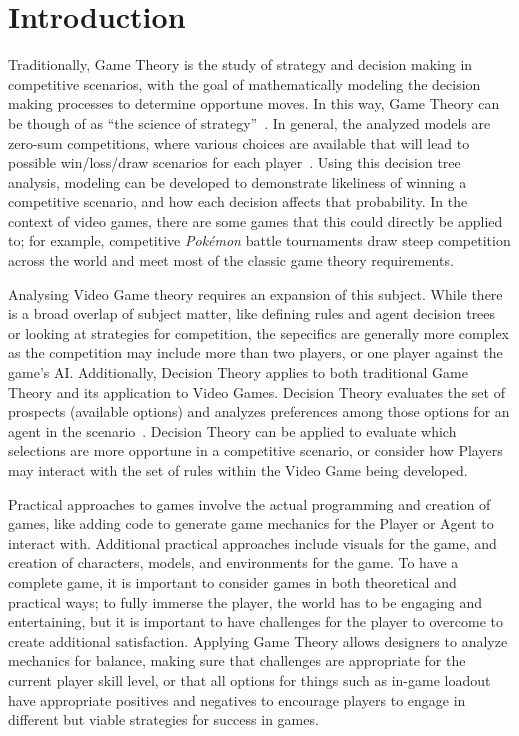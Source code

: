 
\section{Introduction}

Traditionally, Game Theory is the study of strategy and decision making in competitive scenarios, with the goal of mathematically modeling the decision making processes to determine opportune moves. In this way, Game Theory can be though of as ``the science of strategy''~\cite{b3}. In general, the analyzed models are zero-sum competitions, where various choices are available that will lead to possible win/loss/draw scenarios for each player~\cite{b1}. Using this decision tree analysis, modeling can be developed to demonstrate likeliness of winning a competitive scenario, and how each decision affects that probability. In the context of video games, there are some games that this could directly be applied to; for example, competitive \textit{Pok\'emon} battle tournaments draw steep competition across the world and meet most of the classic game theory requirements. 

Analysing Video Game theory requires an expansion of this subject. While there is a broad overlap of subject matter, like defining rules and agent decision trees or looking at strategies for competition, the sepecifics are generally more complex as the competition may include more than two players,  or one player against the game's \ac{AI}. Additionally, Decision Theory applies to both traditional Game Theory and its application to Video Games. Decision Theory evaluates the set of prospects (available options) and analyzes preferences among those options for an agent in the scenario~\cite{b2}. Decision Theory can be applied to evaluate which selections are more opportune in a competitive scenario, or consider how Players may interact with the set of rules within the Video Game being developed.

Practical approaches to games involve the actual programming and creation of games, like adding code to generate game mechanics for the Player or Agent to interact with. Additional practical approaches include visuals for the game, and creation of characters, models, and environments for the game. To have a complete game, it is important to consider games in both theoretical and practical ways; to fully immerse the player, the world has to be engaging and entertaining, but it is important to have challenges for the player to overcome to create additional satisfaction. Applying Game Theory allows designers to analyze mechanics for balance, making sure that challenges are appropriate for the current player skill level, or that all options for things such as in-game loadout have appropriate positives and negatives to encourage players to engage in different but viable strategies for success in games.

